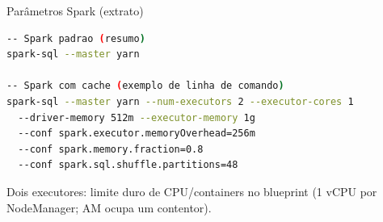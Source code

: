 \begin{frame}[fragile]{Par\^ametros Spark (extrato)}
  \begin{lstlisting}[language=bash, gobble=0]
-- Spark padrao (resumo)
spark-sql --master yarn

-- Spark com cache (exemplo de linha de comando)
spark-sql --master yarn --num-executors 2 --executor-cores 1
  --driver-memory 512m --executor-memory 1g
  --conf spark.executor.memoryOverhead=256m
  --conf spark.memory.fraction=0.8
  --conf spark.sql.shuffle.partitions=48
  \end{lstlisting}
  \vspace{0.25em}
  {\scriptsize\color{cefetMuted}Dois executores: limite duro de CPU/containers no blueprint (1 vCPU por NodeManager; AM ocupa um contentor).}
\end{frame}
